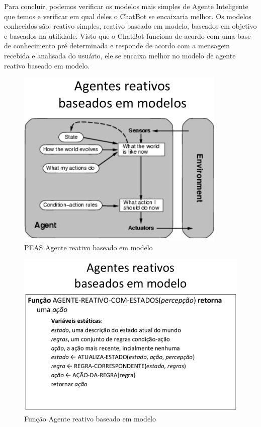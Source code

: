 Para concluir, podemos verificar os modelos mais simples de Agente Inteligente que temos e verificar em qual deles o ChatBot se encaixaria melhor. Os modelos conhecidos são: reativo simples, reativo baseado em modelo, baseados em objetivo e baseados na utilidade.
Visto que o ChatBot funciona de acordo com uma base de conhecimento pré determinada e responde de acordo com a mensagem recebida e analisada do usuário, ele se encaixa melhor no modelo de agente reativo baseado em modelo.

\begin{figure}[H]
   \begin{center}
      \includegraphics[width=10cm]{img/reativo.png}
      \caption{PEAS Agente reativo baseado em modelo} \label{reativo}
   \end{center}
\end{figure}

\begin{figure}[H]
   \begin{center}
      \includegraphics[width=12cm]{img/reativo2.png}
      \caption{Função Agente reativo baseado em modelo} \label{reativo2}
   \end{center}
\end{figure}


